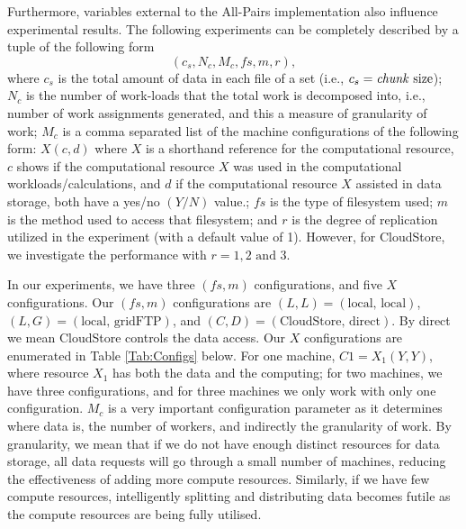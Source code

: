 \documentclass{rspublic}
\begin{document}
Furthermore, variables external to the All-Pairs implementation also
influence experimental results. The following experiments can be
completely described by a tuple of the following form
 \begin{equation}
(c_s, N_c, M_c, fs, m,r),
\label{Eq:tuple}
\end{equation}
where $c_s$ is the total amount of data in each file of a set (i.e.,
$c_s=\mbox{\textit{chunk} size}$); $N_c$ is the number of work-loads
that the total work is decomposed into, i.e., number of work assignments
generated, and this a measure of granularity of work; $M_c$ is a comma
separated list of the machine configurations of the following form:
$X(c, d)$ where $X$ is a shorthand reference for the computational
resource, $c$ shows if the computational resource $X$ was used in the
computational workloads/calculations, and $d$ if the computational
resource $X$ assisted in data storage, both have a yes/no $(Y/N)$
value.; $fs$ is the type of filesystem used; $m$ is the method used to
access that filesystem; and $r$ is the degree of replication utilized in
the experiment (with a default value of 1). However, for CloudStore, we
investigate the performance with $r = 1, 2 \mbox{ and } 3$.

In our experiments, we have three $(fs, m)$ configurations, and five $X$
configurations. Our $(fs, m)$ configurations are $(L,L)=(\mbox{local,
local})$, $(L,G)=(\mbox{local, gridFTP})$, and $(C,D)=(\mbox{CloudStore,
direct})$. By direct we mean CloudStore controls the data access. Our
$X$ configurations are enumerated in Table \ref{Tab:Configs} below. For
one machine, $C1=X_1(Y,Y)$, where resource $X_1$ has both the data and
the computing; for two machines, we have three configurations, and for
three machines we only work with only one configuration. $M_c$ is a very
important configuration parameter as it determines where data is, the
number of workers, and indirectly the granularity of work. By
granularity, we mean that if we do not have enough distinct resources
for data storage, all data requests will go through a small number of
machines, reducing the effectiveness of adding more compute resources.
Similarly, if we have few compute resources, intelligently splitting and
distributing data becomes futile as the compute resources are being
fully utilised.
\end{document}
